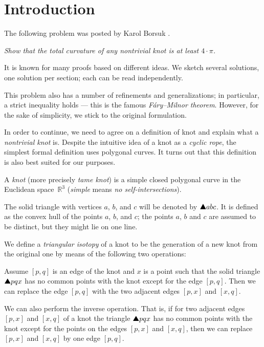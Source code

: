 \section*{Introduction}

The following problem was posted by Karol Borsuk \cite{borsuk}.

\smallskip

\textit{Show that the total curvature of any nontrivial knot is at least $4\cdot\pi$.}

\smallskip

It is known for many proofs based on different ideas.
We sketch several solutions, one solution per section;
each can be read independently.

This problem also has a number of refinements and generalizations;
in particular, a strict inequality holds --- this is the famous \emph{F\'ary--Milnor theorem}.
However, for the sake of simplicity, we stick to the original formulation.

In order to continue, we need to agree on a definition of knot and explain what a \emph{nontrivial knot} is.
Despite the intuitive idea of a knot as a \emph{cyclic rope},
the simplest formal definition uses polygonal curves.
It turns out that this definition is also best suited for our purposes.

A \emph{knot} (more precisely \emph{tame knot}) is a simple closed polygonal curve in the Euclidean space~$\mathbb{R}^3$ (\emph{simple} means \emph{no self-intersections}).

The solid triangle with vertices $a$, $b$, and $c$ will be denoted by $\solidtriangle abc$.
It is defined as the convex hull of the points $a$, $b$, and $c$;
the points $a$, $b$ and $c$ are assumed to be distinct, but they might lie on one line.

We define a \emph{triangular isotopy} of a knot to be the generation of a new knot from the original one by means of the
following two operations:

Assume $[p,q]$ is an edge of the knot and $x$
is a point such that the solid triangle $\solidtriangle pqx$  has no common points with the knot except for the edge $[p,q]$.
Then we can replace the edge $[p,q]$ with the two adjacent edges $[p,x]$ and $[x,q]$.

We can also perform the inverse operation.
That is, if for two adjacent edges $[p,x]$ and $[x,q]$ of a knot the triangle
$\solidtriangle pqx$ has no common points with the knot except for the points on the edges $[p,x]$ and $[x,q]$,
then we can replace $[p,x]$ and $[x,q]$ by one edge $[p,q]$.

